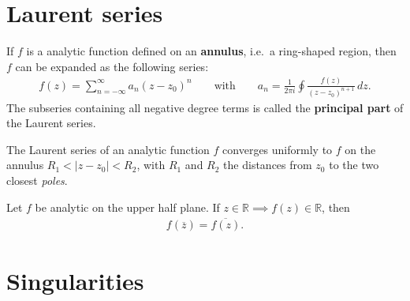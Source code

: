 \section{Laurent series}

    \begin{definition}\label{complex:laurent_series}
        If $f$ is a analytic function defined on an \textbf{annulus}, i.e.~a ring-shaped region, then $f$ can be expanded as the following series:
        \begin{gather}
            f(z) = \sum^\infty_{n=-\infty}a_n(z-z_0)^n \qquad\text{with}\qquad a_n = \frac{1}{2\pi i}\oint\frac{f(z)}{(z-z_0)^{n+1}}\,dz.
        \end{gather}
        The subseries containing all negative degree terms is called the \textbf{principal part} of the Laurent series.
    \end{definition}

    \begin{property}
        The Laurent series of an analytic function $f$ converges uniformly to $f$ on the annulus $R_1 < |z-z_0| < R_2$, with $R_1$ and $R_2$ the distances from $z_0$ to the two closest \textit{poles}.
    \end{property}


    \begin{theorem}
        Let $f$ be analytic on the upper half plane. If $z\in\mathbb{R}\implies f(z)\in\mathbb{R}$, then
        \begin{gather}
            f(\overline{z}) = \overline{f(z)}.
        \end{gather}
    \end{theorem}

\section{Singularities}
